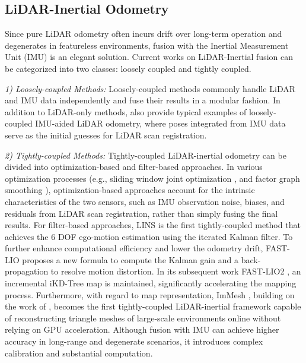 \subsection{LiDAR-Inertial Odometry}
Since pure LiDAR odometry often incurs drift over long-term operation and degenerates in featureless environments, fusion with the Inertial Measurement Unit (IMU) is an elegant solution. Current works on LiDAR-Inertial fusion can be categorized into two classes: loosely coupled and tightly coupled.

\emph{1) Loosely-coupled Methods:}
Loosely-coupled methods commonly handle LiDAR and IMU data independently and fuse their results in a modular fashion. In addition to LiDAR-only methods, \cite{zhang2017low, 8594299} also provide typical examples of loosely-coupled IMU-aided LiDAR odometry, where poses integrated from IMU data serve as the initial guesses for LiDAR scan registration.

\emph{2) Tightly-coupled Methods:}
Tightly-coupled LiDAR-inertial odometry can be divided into optimization-based and filter-based approaches. In various optimization processes (e.g., sliding window joint optimization \cite{8793511, 9392274}, and factor graph smoothing \cite{9341176}), optimization-based approaches account for the intrinsic characteristics of the two sensors, such as IMU observation noise, biases, and residuals from LiDAR scan registration, rather than simply fusing the final results.
For filter-based approaches, LINS \cite{9197567} is the first tightly-coupled method that achieves the 6 DOF ego-motion estimation using the iterated Kalman filter. To further enhance computational efficiency and lower the odometry drift, FAST-LIO \cite{9372856} proposes a new formula to compute the Kalman gain and a back-propagation to resolve motion distortion. In its subsequent work FAST-LIO2 \cite{9697912}, an incremental iKD-Tree map is maintained, significantly accelerating the mapping process.
Furthermore, with regard to map representation, ImMesh \cite{10304337}, building on the work of \cite{9813516}, becomes the first tightly-coupled LiDAR-inertial framework capable of reconstructing triangle meshes of large-scale environments online without relying on GPU acceleration.
Although fusion with IMU can achieve higher accuracy in long-range and degenerate scenarios, it introduces complex calibration and substantial computation.

